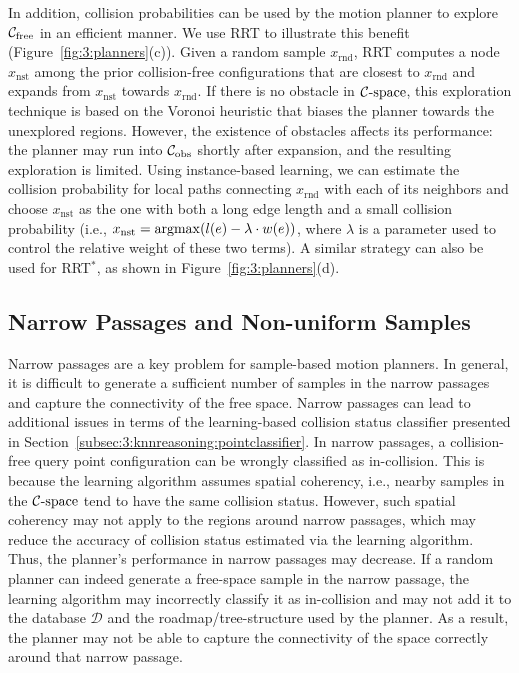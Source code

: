 In addition, collision probabilities can be used by the motion planner to explore $\mathcal C_{\text{free}}$ in an efficient manner. We use RRT to illustrate this benefit (Figure~\ref{fig:3:planners}(c)). Given a random sample $x_{\text{rnd}}$, RRT computes a node $x_{\text{nst}}$ among the prior collision-free configurations that are closest to $x_{\text{rnd}}$ and expands from $x_{\text{nst}}$ towards $x_{\text{rnd}}$. If there is no obstacle in $\mathcal C\text{-space}$, this exploration technique is based on the Voronoi heuristic that biases the planner towards the unexplored regions. However, the existence of obstacles affects its performance: the planner may run into $\mathcal C_{\text{obs}}$ shortly after expansion, and the resulting exploration is limited. Using instance-based learning, we can estimate the collision probability for local paths connecting $x_{\text{rnd}}$ with each of its neighbors and choose $x_{\text{nst}}$ as the one with both a long edge length and a small collision probability (i.e., $x_{\text{nst}} = \operatorname{argmax}(l(e) - \lambda \cdot w(e))$, where $\lambda$ is a parameter used to control the relative weight of these two terms). A similar strategy can also be used for RRT${}^*$, as shown in Figure~\ref{fig:3:planners}(d).




\subsection{Narrow Passages and Non-uniform Samples}
\label{subsec:3:narrowpassage}
Narrow passages are a key problem for sample-based motion planners. In general, it is difficult to generate a sufficient number of samples in the narrow passages and capture the connectivity of the free space. Narrow passages can lead to additional issues in terms of the learning-based collision status classifier presented in Section~\ref{subsec:3:knnreasoning:pointclassifier}. In narrow passages, a collision-free query point configuration can be wrongly classified as in-collision.
This is because the learning algorithm assumes spatial coherency, i.e., nearby samples in the $\mathcal C\text{-space}$ tend to have the same collision status. However, such spatial coherency may not apply to the regions around narrow passages, which may reduce the accuracy of collision status estimated via the learning algorithm. 
Thus, the planner's performance in narrow passages may decrease. If a random planner can indeed generate a free-space sample in the narrow passage, the learning algorithm may incorrectly classify it as in-collision and may not add it to the database $\mathcal D$ and the roadmap/tree-structure used by the planner. As a result, the planner may not be able to capture the connectivity of the space correctly around that narrow passage.


